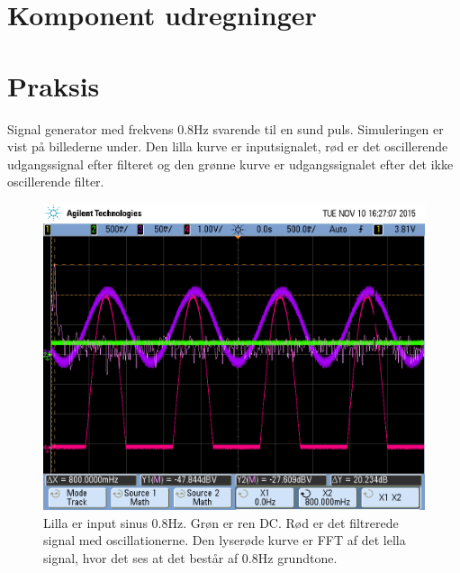 \section{Komponent udregninger}


\section{Praksis}
Signal generator med frekvens 0.8Hz svarende til en sund puls. Simuleringen er vist på billederne under. Den lilla kurve er inputsignalet, rød er det oscillerende udgangssignal efter filteret og den grønne kurve er udgangssignalet efter det ikke oscillerende filter.

\begin{figure}[H]
	\includegraphics[width=\textwidth]{billeder/scope_9.png}
	\caption{Lilla er input sinus 0.8Hz. Grøn er ren DC. Rød er det filtrerede signal med oscillationerne. Den lyserøde kurve er FFT af det lella signal, hvor det ses at det består af 0.8Hz grundtone.}\label{fig:filterone}
\end{figure}

